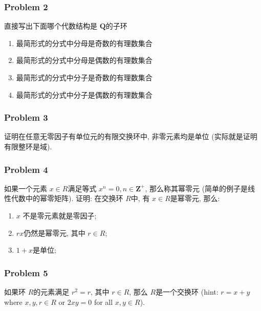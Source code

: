 \documentclass[a4paper,12pt]{ctexart}
\newcommand{\Z}{\mathbf{Z}}
\newcommand{\Q}{\mathbf{Q}}
\begin{document}
\subsubsection*{Problem 2}
   直接写出下面哪个代数结构是 $ \Q $的子环
   \begin{enumerate}
     \item 最简形式的分式中分母是奇数的有理数集合
     \item 最简形式的分式中分母是偶数的有理数集合
     \item 最简形式的分式中分子是奇数的有理数集合
     \item 最简形式的分式中分子是偶数的有理数集合
   \end{enumerate}
\subsubsection*{Problem 3}
    证明在任意无零因子有单位元的有限交换环中, 非零元素均是单位 (实际就是证明有限整环是域).
\subsubsection*{Problem 4}
    如果一个元素 $ x\in R $满足等式 $ x^n=0,n\in\Z^+ $, 那么称其幂零元 (简单的例子是线性代数中的幂零矩阵). 证明: 在交换环 $ R $中,
    有 $ x\in R $是幂零元, 那么:
    \begin{enumerate}
      \item $ x $ 不是零元素就是零因子;
      \item $ rx $仍然是幂零元, 其中 $ r\in R $;
      \item $ 1+x $是单位; 
    \end{enumerate}
\subsubsection*{Problem 5}
    如果环 $ R $的元素满足 $ r^2=r $, 其中 $ r\in R $, 那么 $ R $是一个交换环 (hint: $ r=x+y $ where $ x,y,r\in R $ or $ 2xy=0 $ for all $ x,y\in R $).

    
 
\end{document}
